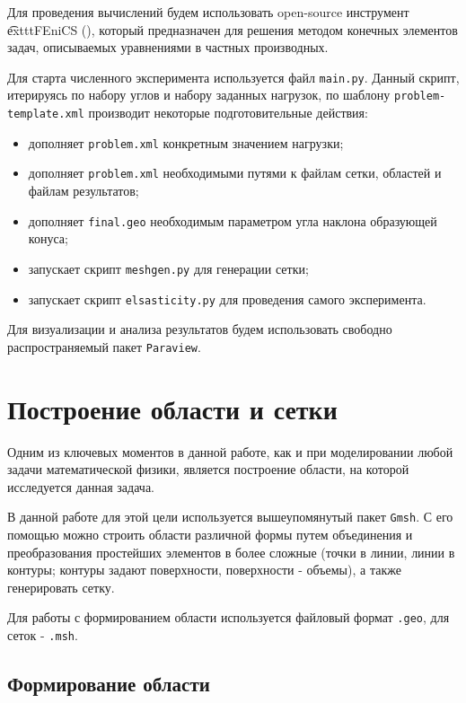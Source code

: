 \documentclass[a4paper, 14pt]{extreport}
\begin{document}
Для проведения вычислений будем использовать open-source
инструмент \t exttt{FEniCS} (\cite{fenics_book}), который 
предназначен  для решения методом конечных элементов  
задач, описываемых  уравнениями в частных производных. 

Для старта численного эксперимента используется файл \texttt{main.py}.
Данный скрипт, итерируясь по набору углов и набору заданных 
нагрузок, по шаблону \texttt{problem-template.xml} 
производит некоторые подготовительные действия:

\begin{itemize}
\item дополняет \texttt{problem.xml} конкретным значением нагрузки;
\item дополняет \texttt{problem.xml} необходимыми путями к файлам сетки, 
областей и файлам результатов;
\item дополняет \texttt{final.geo} необходимым параметром угла наклона
 образующей конуса;
\item запускает скрипт \texttt{meshgen.py} для генерации сетки;
\item запускает скрипт \texttt{elsasticity.py} для проведения самого 
эксперимента.
\end{itemize}

Для визуализации и анализа результатов будем использовать
свободно распространяемый  пакет \texttt{Paraview}.

\section{Построение области и сетки}

Одним из ключевых моментов в данной работе, как и при моделировании 
любой задачи математической физики, является построение области, 
на которой исследуется данная задача.

В данной работе для этой цели используется вышеупомянутый пакет
 \texttt{Gmsh}. С его помощью можно строить области различной формы
 путем объединения и преобразования простейших элементов в более 
 сложные (точки в линии, линии в контуры; контуры задают поверхности,
  поверхности - объемы), а также генерировать сетку.

Для работы с формированием области используется файловый формат 
\texttt{.geo}, для сеток - \texttt{.msh}.

\subsection{Формирование области}
\end{document}
